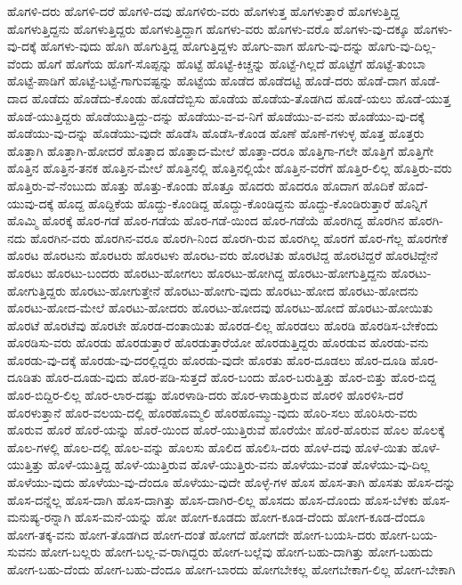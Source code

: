 {ಹೊಗಳಿ-ದರು
ಹೊಗಳಿ-ದರೆ
ಹೊಗಳಿ-ದವು
ಹೊಗಳಿರು-ವರು
ಹೊಗಳುತ್ತ
ಹೊಗಳುತ್ತಾರೆ
ಹೊಗಳುತ್ತಿದ್ದ
ಹೊಗಳುತ್ತಿದ್ದನು
ಹೊಗಳುತ್ತಿದ್ದರು
ಹೊಗಳುತ್ತಿದ್ದಾಗ
ಹೊಗಳು-ವರು
ಹೊಗಳು-ವರೊ
ಹೊಗಳು-ವು-ದಕ್ಕೂ
ಹೊಗಳು-ವು-ದಕ್ಕೆ
ಹೊಗಳು-ವುದು
ಹೊಗಿ
ಹೊಗುತ್ತಿದ್ದ
ಹೊಗುತ್ತಿದ್ದಳು
ಹೊಗು-ವಾಗ
ಹೊಗು-ವು-ದನ್ನು
ಹೊಗು-ವು-ದಿಲ್ಲ-ವೆಂದು
ಹೊಗೆ
ಹೊಗೆಯ
ಹೊಗೆ-ಸೊಪ್ಪನ್ನು
ಹೊಟ್ಟೆ
ಹೊಟ್ಟೆ-ಕಿಚ್ಚನ್ನು
ಹೊಟ್ಟೆ-ಗಿಲ್ಲದೆ
ಹೊಟ್ಟೆಗೆ
ಹೊಟ್ಟೆ-ತುಂಬಾ
ಹೊಟ್ಟೆ-ಪಾಡಿಗೆ
ಹೊಟ್ಟೆ-ಬಟ್ಟೆ-ಗಾಗುವಷ್ಟನ್ನು
ಹೊಟ್ಟೆಯ
ಹೊಡೆದ
ಹೊಡೆದಟ್ಟಿ
ಹೊಡೆ-ದರು
ಹೊಡೆ-ದಾಗ
ಹೊಡೆ-ದಾದ
ಹೊಡೆದು
ಹೊಡೆದು-ಕೊಂಡು
ಹೊಡೆದೆಬ್ಬಿಸು
ಹೊಡೆಯ
ಹೊಡೆಯ-ತೊಡಗಿದ
ಹೊಡೆ-ಯಲು
ಹೊಡೆ-ಯುತ್ತ
ಹೊಡೆ-ಯುತ್ತಿದ್ದರು
ಹೊಡೆಯುತ್ತಿದ್ದು-ದನ್ನು
ಹೊಡೆಯು-ವ-ವ-ನಿಗೆ
ಹೊಡೆಯು-ವ-ವನು
ಹೊಡೆಯು-ವು-ದಕ್ಕೆ
ಹೊಡೆಯು-ವು-ದನ್ನು
ಹೊಡೆಯು-ವುದೇ
ಹೊಡೆಸಿ
ಹೊಡೆಸಿ-ಕೊಂಡ
ಹೊಣೆ
ಹೊಣೆ-ಗಳುಳ್ಳ
ಹೊತ್ತ
ಹೊತ್ತರು
ಹೊತ್ತಾಗಿ
ಹೊತ್ತಾಗಿ-ಹೋದರೆ
ಹೊತ್ತಾದ
ಹೊತ್ತಾದ-ಮೇಲೆ
ಹೊತ್ತಾ-ದರೂ
ಹೊತ್ತಿಗಾ-ಗಲೇ
ಹೊತ್ತಿಗೆ
ಹೊತ್ತಿಗೇ
ಹೊತ್ತಿನ
ಹೊತ್ತಿನ-ತನಕ
ಹೊತ್ತಿನ-ಮೇಲೆ
ಹೊತ್ತಿನಲ್ಲಿ
ಹೊತ್ತಿನಲ್ಲಿಯೇ
ಹೊತ್ತಿನ-ವರೆಗೆ
ಹೊತ್ತಿರ-ಲಿಲ್ಲ
ಹೊತ್ತಿರು-ವರು
ಹೊತ್ತಿರು-ವೆ-ನೆಂಬುದು
ಹೊತ್ತು
ಹೊತ್ತು-ಕೊಂಡು
ಹೊತ್ತೂ
ಹೊದರು
ಹೊದರೂ
ಹೊದಾಗ
ಹೊದಿಕೆ
ಹೊದೆ-ಯುವು-ದಕ್ಕೆ
ಹೊದ್ದ
ಹೊದ್ದಿಕೆಯ
ಹೊದ್ದು-ಕೊಂಡಿದ್ದ
ಹೊದ್ದು-ಕೊಂಡಿದ್ದನು
ಹೊದ್ದು-ಕೊಂಡಿರುತ್ತಾರೆ
ಹೊನ್ನಿಗೆ
ಹೊಮ್ಮಿ
ಹೊರಕ್ಕೆ
ಹೊರ-ಗಡೆ
ಹೊರ-ಗಡೆಯ
ಹೊರ-ಗಡೆ-ಯಿಂದ
ಹೊರ-ಗಡೆಯೆ
ಹೊರಗಿದ್ದ
ಹೊರಗಿನ
ಹೊರಗಿ-ನದು
ಹೊರಗಿನ-ವರು
ಹೊರಗಿನ-ವರೂ
ಹೊರಗಿ-ನಿಂದ
ಹೊರಗಿ-ರುವ
ಹೊರಗಿಲ್ಲ
ಹೊರಗೆ
ಹೊರ-ಗೆಲ್ಲ
ಹೊರಗೇಕೆ
ಹೊರಟ
ಹೊರಟನು
ಹೊರಟರು
ಹೊರಟಳು
ಹೊರಟ-ವರು
ಹೊರಟಿತು
ಹೊರಟಿದ್ದ
ಹೊರಟಿದ್ದರೆ
ಹೊರಟಿದ್ದೇನೆ
ಹೊರಟು
ಹೊರಟು-ಬಂದರು
ಹೊರಟು-ಹೋಗಲು
ಹೊರಟು-ಹೋಗಿದ್ದ
ಹೊರಟು-ಹೋಗುತ್ತಿದ್ದನು
ಹೊರಟು-ಹೋಗುತ್ತಿದ್ದರು
ಹೊರಟು-ಹೋಗುತ್ತೇನೆ
ಹೊರಟು-ಹೋಗು-ವುದು
ಹೊರಟು-ಹೋದ
ಹೊರಟು-ಹೋದನು
ಹೊರಟು-ಹೋದ-ಮೇಲೆ
ಹೊರಟು-ಹೋದರು
ಹೊರಟು-ಹೋದವು
ಹೊರಟು-ಹೋದೆ
ಹೊರಟು-ಹೋಯಿತು
ಹೊರಟೆ
ಹೊರಟೆವು
ಹೊರಟೇ
ಹೊರಡ-ದಂತಾಯಿತು
ಹೊರಡ-ಲಿಲ್ಲ
ಹೊರಡಲು
ಹೊರಡಿ
ಹೊರಡಿಸ-ಬೇಕೆಂದು
ಹೊರಡಿಸು-ವರು
ಹೊರಡು
ಹೊರಡುತ್ತಾರೆ
ಹೊರಡುತ್ತಾರೆಯೋ
ಹೊರಡುತ್ತಿದ್ದರು
ಹೊರಡುವ
ಹೊರಡು-ವನು
ಹೊರಡು-ವು-ದಕ್ಕೆ
ಹೊರಡು-ವು-ದರಲ್ಲಿದ್ದರು
ಹೊರಡು-ವುದೇ
ಹೊರತು
ಹೊರ-ದೂಡಲು
ಹೊರ-ದೂಡಿ
ಹೊರ-ದೂಡಿತು
ಹೊರ-ದೂಡು-ವುದು
ಹೊರ-ಪಡಿ-ಸುತ್ತದೆ
ಹೊರ-ಬಂದು
ಹೊರ-ಬರುತ್ತಿತ್ತು
ಹೊರ-ಬಿತ್ತು
ಹೊರ-ಬಿದ್ದ
ಹೊರ-ಬಿದ್ದಿರ-ಲಿಲ್ಲ
ಹೊರ-ಲಾರ-ದಷ್ಟು
ಹೊರಳಾಡಿ-ದರು
ಹೊರ-ಳಾಡುತ್ತಿರುವ
ಹೊರಳಿ
ಹೊರಳಿಸಿ-ದರೆ
ಹೊರಳುತ್ತಾನೆ
ಹೊರ-ವಲಯ-ದಲ್ಲಿ
ಹೊರಹೊಮ್ಮಲಿ
ಹೊರಹೊಮ್ಮು-ವುದು
ಹೊರಿ-ಸಲು
ಹೊರಿಸಿರು-ವರು
ಹೊರುವ
ಹೊರೆ
ಹೊರೆ-ಯನ್ನು
ಹೊರೆ-ಯಿಂದ
ಹೊರೆ-ಯುತ್ತಿರುವೆ
ಹೊರೆಯೇ
ಹೊರೆ-ಹೊರುವ
ಹೊಲ
ಹೊಲಕ್ಕೆ
ಹೊಲ-ಗಳಲ್ಲಿ
ಹೊಲ-ದಲ್ಲಿ
ಹೊಲ-ವನ್ನು
ಹೊಲಸು
ಹೊಲಿದ
ಹೊಲಿಸಿ-ದರು
ಹೊಳೆ-ದವು
ಹೊಳೆ-ಯಿತು
ಹೊಳೆ-ಯುತ್ತಿತ್ತು
ಹೊಳೆ-ಯುತ್ತಿದ್ದ
ಹೊಳೆ-ಯುತ್ತಿರುವ
ಹೊಳೆ-ಯುತ್ತಿರು-ವನು
ಹೊಳೆಯು-ವಂತೆ
ಹೊಳೆಯು-ವು-ದಿಲ್ಲ
ಹೊಳೆಯು-ವುದು
ಹೊಳೆಯು-ವು-ದೆಂದೂ
ಹೊಳೆಯು-ವುದೇ
ಹೊಳ್ಳೆ-ಗಳ
ಹೊಸ
ಹೊಸ-ತಾಗಿ
ಹೊಸತು
ಹೊಸ-ದನ್ನು
ಹೊಸ-ದನ್ನೆಲ್ಲ
ಹೊಸ-ದಾಗಿ
ಹೊಸ-ದಾಗಿತ್ತು
ಹೊಸ-ದಾಗಿರ-ಲಿಲ್ಲ
ಹೊಸದು
ಹೊಸ-ದೊಂದು
ಹೊಸ-ಬೆಳಕು
ಹೊಸ-ಮನುಷ್ಯ-ರನ್ನಾಗಿ
ಹೊಸ-ಮನೆ-ಯನ್ನು
ಹೋ
ಹೋಗ-ಕೂಡದು
ಹೋಗ-ಕೂಡ-ದೆಂದು
ಹೋಗ-ಕೂಡ-ದೆಂದೂ
ಹೋಗ-ತಕ್ಕ-ವನು
ಹೋಗ-ತೊಡಗಿದ
ಹೋಗ-ದಂತೆ
ಹೋಗದೆ
ಹೋಗದೇ
ಹೋಗ-ಬಯಸಿ-ದರು
ಹೋಗ-ಬಯ-ಸುವನು
ಹೋಗ-ಬಲ್ಲರು
ಹೋಗ-ಬಲ್ಲ-ವ-ರಾಗಿದ್ದರು
ಹೋಗ-ಬಲ್ಲೆವು
ಹೋಗ-ಬಹು-ದಾಗಿತ್ತು
ಹೋಗ-ಬಹುದು
ಹೋಗ-ಬಹು-ದೆಂದು
ಹೋಗ-ಬಹು-ದೆಂದೂ
ಹೋಗ-ಬಾರದು
ಹೋಗಬೇಕಲ್ಲ
ಹೋಗಬೇಕಾಗ-ಲಿಲ್ಲ
ಹೋಗ-ಬೇಕಾಗಿ
}
